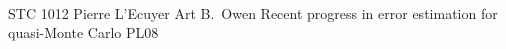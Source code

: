 	\\\hline
	{STC 1012}	%
	{Pierre L'Ecuyer}		%
	{Art B.~Owen}	%
	{Recent progress in error estimation for quasi-Monte Carlo}		%
	{PL08}			%
	\\\hline
